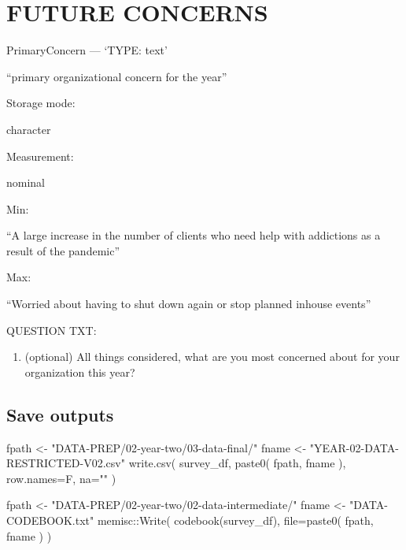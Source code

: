 \documentclass[
  letterpaper,
]{scrbook}
\newenvironment{Shaded}{\begin{snugshade}}{\end{snugshade}}
\newcommand{\AttributeTok}[1]{\textcolor[rgb]{0.40,0.45,0.13}{#1}}
\newcommand{\FunctionTok}[1]{\textcolor[rgb]{0.28,0.35,0.67}{#1}}
\newcommand{\NormalTok}[1]{\textcolor[rgb]{0.00,0.23,0.31}{#1}}
\newcommand{\OtherTok}[1]{\textcolor[rgb]{0.00,0.23,0.31}{#1}}
\newcommand{\SpecialCharTok}[1]{\textcolor[rgb]{0.37,0.37,0.37}{#1}}
\newcommand{\StringTok}[1]{\textcolor[rgb]{0.13,0.47,0.30}{#1}}
\providecommand{\tightlist}{%
  \setlength{\itemsep}{0pt}\setlength{\parskip}{0pt}}\usepackage{longtable,booktabs,array}
\begin{document}
\chapter{FUTURE CONCERNS}\label{future-concerns}

PrimaryConcern --- {`TYPE: text'}

``primary organizational concern for the year''

Storage mode:

character

Measurement:

nominal

Min:

``A large increase in the number of clients who need help with
addictions as a result of the pandemic''

Max:

``Worried about having to shut down again or stop planned inhouse
events''

QUESTION TXT:

\begin{enumerate}
\def\labelenumi{\arabic{enumi}.}
\setcounter{enumi}{16}
\tightlist
\item
  (optional) All things considered, what are you most concerned about
  for your organization this year?
\end{enumerate}

\section{Save outputs}\label{save-outputs}

\begin{Shaded}
\begin{Highlighting}[]
\NormalTok{fpath }\OtherTok{\textless{}{-}} \StringTok{"DATA{-}PREP/02{-}year{-}two/03{-}data{-}final/"}
\NormalTok{fname }\OtherTok{\textless{}{-}} \StringTok{"YEAR{-}02{-}DATA{-}RESTRICTED{-}V02.csv"}
\FunctionTok{write.csv}\NormalTok{( survey\_df, }\FunctionTok{paste0}\NormalTok{( fpath, fname ), }\AttributeTok{row.names=}\NormalTok{F, }\AttributeTok{na=}\StringTok{""}\NormalTok{ )}
\end{Highlighting}
\end{Shaded}

\begin{Shaded}
\begin{Highlighting}[]
\NormalTok{fpath }\OtherTok{\textless{}{-}} \StringTok{"DATA{-}PREP/02{-}year{-}two/02{-}data{-}intermediate/"}
\NormalTok{fname }\OtherTok{\textless{}{-}} \StringTok{"DATA{-}CODEBOOK.txt"}
\NormalTok{memisc}\SpecialCharTok{::}\FunctionTok{Write}\NormalTok{( }\FunctionTok{codebook}\NormalTok{(survey\_df), }\AttributeTok{file=}\FunctionTok{paste0}\NormalTok{( fpath, fname ) )}
\end{Highlighting}
\end{Shaded}
\end{document}
